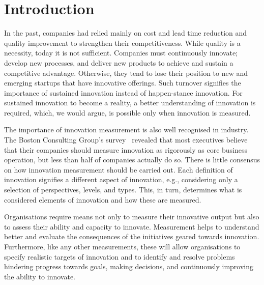 \documentclass[sigconf,review]{acmart}
\begin{document}



\maketitle


\section{Introduction}\label{sec:intro}
In the past, companies had relied mainly on cost and lead time reduction and quality improvement to strengthen their competitiveness. While quality is a necessity, today it is not sufficient. Companies must continuously innovate; develop new processes, and deliver new products to achieve and sustain a competitive advantage. Otherwise, they tend to lose their position to new and emerging startups that have innovative offerings. Such turnover signifies the importance of sustained innovation instead of happen-stance innovation. For sustained innovation to become a reality, a better understanding of innovation is required, which, we would argue, is possible only when innovation is measured.

The importance of innovation measurement is also well recognised in industry. The Boston Consulting Group's survey~\cite{andrew08} revealed that most executives believe that their companies should measure innovation as rigorously as core business operation, but less than half of companies actually do so. There is little consensus on how innovation measurement should be carried out. Each definition of innovation signifies a different aspect of innovation, e.g., considering only a selection of perspectives, levels, and types. This, in turn, determines what is considered elements of innovation and how these are measured.

Organisations require means not only to measure their innovative output but also to assess their ability and capacity to innovate. Measurement helps to understand better and evaluate the consequences of the initiatives geared towards innovation. Furthermore, like any other measurements, these will allow organisations to specify realistic targets of innovation and to identify and resolve problems hindering progress towards goals, making decisions, and continuously improving the ability to innovate.
\end{document}
